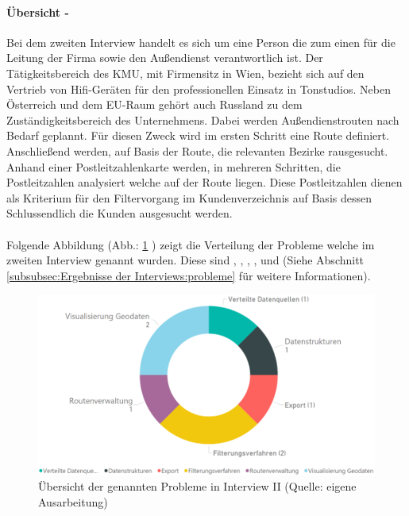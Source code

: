 \documentclass[Bachelorarbeit.tex]{subfiles}
\begin{document}
\paragraph*{Übersicht - }
Bei dem zweiten Interview handelt es sich um eine Person die zum einen für die Leitung der Firma sowie den Außendienst verantwortlich ist.
Der Tätigkeitsbereich des \ac{KMU}, mit Firmensitz in Wien, bezieht sich auf den Vertrieb von Hifi-Geräten für den professionellen Einsatz in Tonstudios.
Neben Österreich und dem EU-Raum gehört auch Russland zu dem Zuständigkeitsbereich des Unternehmens.
Dabei werden Außendienstrouten nach Bedarf geplannt.
Für diesen Zweck wird im ersten Schritt eine Route definiert. 
Anschließend werden, auf Basis der Route, die relevanten Bezirke rausgesucht.
Anhand einer Postleitzahlenkarte werden, in mehreren Schritten, die Postleitzahlen analysiert welche auf der Route liegen.
Diese Postleitzahlen dienen als Kriterium für den Filtervorgang im Kundenverzeichnis auf Basis dessen Schlussendlich die Kunden ausgesucht werden.\\
\\
Folgende Abbildung (Abb.: \ref{fig:ProblemeInterview2} ) zeigt die Verteilung der Probleme welche im zweiten Interview genannt wurden. 
Diese sind , , , ,  und  (Siehe Abschnitt \ref{subsubsec:Ergebnisse der Interviews:probleme}  für weitere Informationen).
\begin{figure}[h]
\centering
\includegraphics[width=1\linewidth]{img/Interviews/ProblemeInterview2}
\caption[Probleme in Interview II]{Übersicht der genannten Probleme in Interview II (Quelle: eigene Ausarbeitung)}
\label{fig:ProblemeInterview2}
\end{figure}
\end{document}

